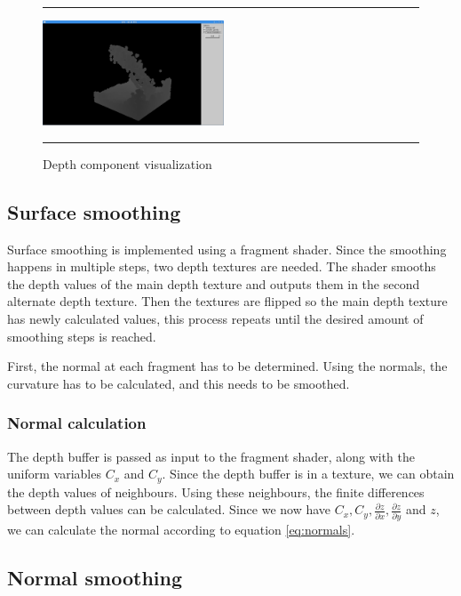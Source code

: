 \begin{figure}[!th]
\hrule
\begin{center}
\vspace*{2ex}\includegraphics[width=0.48\textwidth]{pictures/depth.png}
\end{center}
\caption{Depth component visualization}
\label{fig:depth} 
\vspace*{2ex}
\hrule
\end{figure}

\subsection{Surface smoothing}
Surface smoothing is implemented using a fragment shader.
Since the smoothing happens in multiple steps, two depth textures are needed.
The shader smooths the depth values of the main depth texture and outputs them in the second alternate depth texture.
Then the textures are flipped so the main depth texture has newly calculated values, this process repeats until the desired amount of smoothing steps is reached.

First, the normal at each fragment has to be determined.
Using the normals, the curvature has to be calculated, and this needs to be smoothed.

\subsubsection{Normal calculation}
The depth buffer is passed as input to the fragment shader, along with the uniform variables $C_x$ and $C_y$.
Since the depth buffer is in a texture, we can obtain the depth values of neighbours.
Using these neighbours, the finite differences between depth values can be calculated.
Since we now have $C_x, C_y, \frac{\partial z}{\partial x}, \frac{\partial z}{\partial y}$ and $z$, we can calculate the normal according to equation \ref{eq:normals}.

\subsection{Normal smoothing}